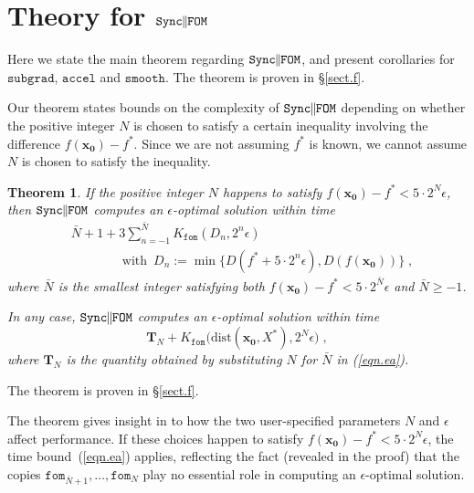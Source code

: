 \documentclass[reqno, 11pt]{amsart}
\newtheorem{thm}[prop]{Theorem}
\numberwithin{equation}{section}
\newcommand{\nt}{\negthinspace}
\newcommand{\fom}{\mathtt{fom}}
\newcommand{\parfom}{\parallel \nt \nt  \mathtt{FOM}}
\newcommand{\subgrad}{\mathtt{subgrad}}
\newcommand{\accel}{\mathtt{accel}}
\newcommand{\smooth}{\mathtt{smooth}}
\newcommand{\sparfom}{\mathtt{Sync} \nt \nt  \parfom}
\newcommand{\dist}{\mathrm{dist}}
\begin{document}
\section{{\bf  Theory for $ \sparfom $}}   \label{sect.e}

Here we state the main theorem regarding $ \sparfom $, and present corollaries for $ \subgrad $, $ \accel $ and $ \smooth $. The theorem is proven in  \S\ref{sect.f}.  

Our theorem states bounds on the complexity of $ \sparfom $ depending on whether the positive integer $ N $ is chosen to satisfy a certain inequality involving the difference $ f(\mathbf{x_0}) - f^* $. Since we are not assuming $ f^* $ is known, we cannot assume $ N $ is chosen to satisfy the inequality. 

\begin{thm}  \label{thm.ea}  
If the positive integer $ N $ happens to satisfy $ f(\mathbf{x_0}) - f^* < 5 \cdot 2^N \epsilon $, then $ \sparfom $ computes an $ \epsilon $-optimal solution within time
\begin{align} 
  & \bar{N}+ 1 +  3 \sum_{n=-1}^{\bar{N}}  K_{\fom}\left(   D_n , 2^n \epsilon \right)   \label{eqn.ea}  \\   
& \qquad \qquad   \textrm{with } \,    D_n :=   \min \{ D(f^* + 5 \cdot 2^n \epsilon), D( f( \mathbf{x_0})) \}  \; , \nonumber 
\end{align}   
where $ \bar{N} $ is the smallest integer satisfying both $ f(\mathbf{x_0}) - f^* < 5 \cdot 2^{\bar{N}} \epsilon $ and $ \bar{N} \geq -1 $.

In any case, $ \sparfom $ computes an $ \epsilon $-optimal solution within time
\begin{equation} \label{eqn.eb} 
\mathbf{T}_N + 
  K_{\fom}\big( \dist( \mathbf{x_0}, X^*), 2^{N} \epsilon \big)   \; , 
\end{equation} 
 where $ \mathbf{T}_N  $ is the quantity obtained by substituting $ N $ for $ \bar{N} $ in (\ref{eqn.ea}).
\end{thm}

The theorem is proven in \S\ref{sect.f}.

The theorem gives insight in to how the two user-specified parameters $N$ and $\epsilon$ affect performance. If these choices happen to satisfy $ f(\mathbf{x_0}) - f^* < 5 \cdot 2^N \epsilon $, the time bound~(\ref{eqn.ea}) applies, reflecting the fact (revealed in the proof) that the copies $ \fom_{\bar{N}+1}, \ldots , \fom_{N} $ play no essential role in computing an $ \epsilon $-optimal solution. 
\end{document}
